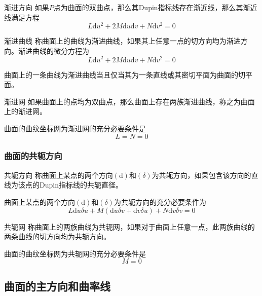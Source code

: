 \documentclass[lang = cn, scheme = chinese, thmcnt = section]{elegantbook}
\newcommand{\dd}{\mathrm{d}}           %
\begin{document}
\begin{definition}{渐进方向}
	如果$P$点为曲面的双曲点，那么其Dupin指标线存在渐近线，那么其渐近线满足方程%
	$$
	L\dd u^2+2M\dd u\dd v+N\dd v^2=0
	$$
\end{definition}

\begin{definition}{渐进曲线}
	称曲面上的曲线为渐进曲线，如果其上任意一点的切方向均为渐进方向。渐进曲线的微分方程为
	$$
	L\dd u^2+2M\dd u\dd v+N\dd v^2=0
	$$
\end{definition}

\begin{theorem}
	曲面上的一条曲线为渐进曲线当且仅当其为一条直线或其密切平面为曲面的切平面。
\end{theorem}

\begin{definition}{渐进网}
	如果曲面上的点均为双曲点，那么曲面上存在两族渐进曲线，称之为曲面上的渐进网。
\end{definition}

\begin{proposition}
	曲面的曲纹坐标网为渐进网的充分必要条件是%
	$$
	L=N=0
	$$
\end{proposition}

\subsubsection{曲面的共轭方向}

\begin{definition}{共轭方向}
	称曲面上某点的两个方向$(\dd)$和$(\delta)$为共轭方向，如果包含该方向的直线为该点的Dupin指标线的共轭直径。
\end{definition}

\begin{theorem}
	曲面上某点的两个方向$(\dd)$和$(\delta)$为共轭方向的充分必要条件为%
	$$
	L\dd u\delta u+M(\dd u\delta v+\dd v\delta u)+N\dd v\delta v=0
	$$
\end{theorem}

\begin{definition}{共轭网}
	称曲面上的两族曲线为共轭网，如果对于曲面上任意一点，此两族曲线的两条曲线的切方向均为共轭方向。
\end{definition}

\begin{proposition}
	曲面的曲纹坐标网为共轭网的充分必要条件是%
	$$
	M=0
	$$
\end{proposition}

\subsection{曲面的主方向和曲率线}
\end{document}
